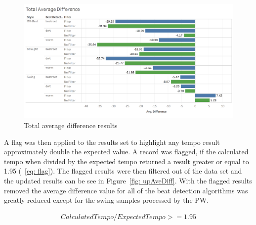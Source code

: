 \documentclass[a4paper, 11pt]{article}
\begin{document}
\begin{figure}[ht]
\centering
\includegraphics[scale=0.25]{images/totAveDiff.jpg}
\caption{Total average difference results}
\label{fig: aveDiff}
\end{figure}

A flag was then applied to the results set to highlight any tempo result approximately double the expected value. A record was flagged, if the calculated tempo when divided by the expected tempo returned a result greater or equal to 1.95 (~\ref{eq: flag}). The flagged results were then filtered out of the data set and the updated results can be see in Figure~\ref{fig: upAveDiff}. With the flagged results removed the average difference value for all of the beat detection algorithms was greatly reduced except for the swing samples processed by the PW. 

\begin{equation}\label{eq: flag}
\begin{split}
Calculated Tempo/Expected Tempo >= 1.95\\
\end{split}
\end{equation}
\end{document}
